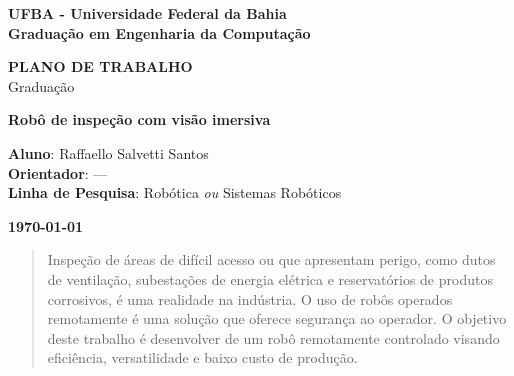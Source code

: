 \documentclass[12pt,a4paper]{article}
\begin{document}

\begin{titlepage}
\thispagestyle{empty}
\begin{center}
\large{\bf{UFBA - Universidade Federal da Bahia}} \\
\large{\bf{Graduação em Engenharia da Computação}} \\
\end{center}
\vfill

\centering
\textbf{{\LARGE PLANO DE TRABALHO}}  \\ \vspace{0.5cm}
{\LARGE Graduação}
\vfill




\textbf{{\Large Robô de inspeção com visão imersiva}} \\ %
\vfill
\begin{flushleft}
\textbf{Aluno}: Raffaello Salvetti Santos \hfill{}\\
\textbf{Orientador}: --- \hfill{}\\
\textbf{Linha de Pesquisa}: Robótica {\it ou} Sistemas Robóticos \hfill{}\\
\end{flushleft}

\vfill


\begin{center}
\large{\bf{\today}}
\end{center}
\end{titlepage}



\begin{abstract}
	Inspeção de áreas de difícil acesso ou que apresentam perigo, como dutos de ventilação, subestações de energia elétrica e reservatórios de produtos corrosivos, é uma realidade na indústria. O uso de robôs operados remotamente é uma solução que oferece segurança ao operador. O objetivo deste trabalho é desenvolver de um robô remotamente controlado visando eficiência, versatilidade e baixo custo de produção.
\end{abstract}


\end{document}
